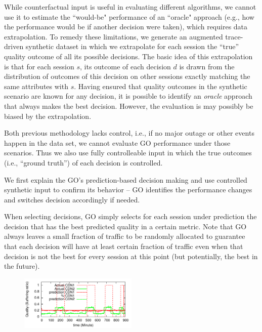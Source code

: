  While counterfactual input is useful in evaluating different algorithms, we cannot use it to estimate the ``would-be" performance of an ``oracle" approach (e.g., how the performance would be if another decision were taken), which requires data extrapolation. To remedy these limitations, we generate an augmented trace-driven synthetic dataset in which we extrapolate for each session the ``true'' quality outcome of all its possible decisions. The basic idea of this extrapolation  is that for each session $s$, its outcome of each decision $d$ is drawn from the distribution of outcomes of this decision on other sessions exactly matching the same attributes with $s$. Having ensured that quality outcomes in the synthetic scenario are known for any decision, it is possible to identify an {\it oracle} approach that always makes the best decision. However, the evaluation is may possibly be biased by the extrapolation.

 Both previous methodology lacks control, i.e., if no major outage or other events happen in the data set, we cannot evaluate GO performance under those scenarios. Thus we also use fully controlleable input in which the true outcomes (i.e., ``ground truth'') of each decision is controlled.


\label{subsec:behavior}

We first explain the GO's prediction-based decision making and use controlled synthetic input to confirm its behavior -- GO identifies the performance changes and switches decision accordingly if needed.

 When selecting decisions, GO simply selects for each session under prediction the decision that has the best predicted quality in a certain metric. Note that GO always leaves a small fraction of traffic to be randomly allocated to guarantee that each decision will have at least certain fraction of traffic even when that decision is not the best for every session at this point (but potentially, the best in the future).


\begin{figure}[h!]
\centering
 \includegraphics[width=0.5\textwidth] {figures/behavior-evaluation/simple-change.pdf}
\label{fig:behavioral}
\end{figure}

